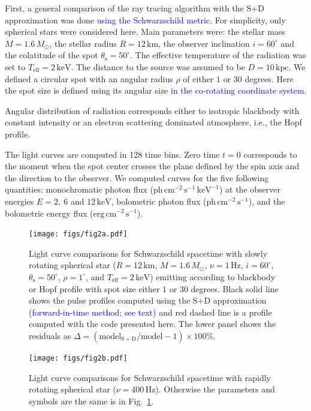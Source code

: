\documentclass{aa}
\newcommand{\refe}[1]{\textcolor{blue}{{#1}}}
\newcommand{\refedel}[1]{}
\newcommand{\sch}{Schwarzschild }
\newcommand{\Msun}{\ensuremath{M_{\odot}}}
\begin{document}
First, a general comparison of the ray tracing algorithm with the S+D approximation was done \refe{using the \sch metric.}
For simplicity, only spherical stars were considered here.
Main parameters were: the stellar mass $M = 1.6\,\Msun$, the stellar radius $R = 12\,\mathrm{km}$, the observer inclination $i = 60^{\circ}$ and the colatitude of the spot $\theta_{\mathrm{s}} = 50^{\circ}$.  
The effective temperature of the radiation was set to $T_{\mathrm{eff}} = 2\,\mathrm{keV}$.  
The distance to the source was assumed to be $D = 10\,\mathrm{kpc}$.  
We defined a circular spot with an angular radius $\rho$ of either $1$ or $30$ degrees.
Here the spot size is defined using its angular size \refe{in the co-rotating coordinate system.}
\refedel{Hence, the spot size is measured using the \textit{angular} size, not the \textit{spatial} size.}
Angular distribution of radiation corresponds either to isotropic blackbody with constant intensity or an electron scattering dominated atmosphere, i.e., the Hopf profile.


The light curves are computed in 128 time bins.  Zero time $t = 0$ corresponds to the moment when the spot center crosses the plane defined by the spin axis and the direction to the observer.  
We computed curves for the five following quantities: monochromatic photon flux ($\mathrm{ph}\,\mathrm{cm}^{-2}\,\mathrm{s}^{-1}\,\mathrm{keV}^{-1}$) at the observer energies $E = 2,~6$ and $12\,\mathrm{keV}$, bolometric photon flux ($\mathrm{ph}\,\mathrm{cm}^{-2}\,\mathrm{s}^{-1}$), and the bolometric energy flux ($\mathrm{erg}\,\mathrm{cm}^{-2}\,\mathrm{s}^{-1}$).


\begin{figure}
\centering
\texttt{[image: figs/fig2a.pdf]}
\caption{\label{fig:sch_comp1}
  Light curve comparisons for \sch spacetime with slowly rotating spherical star ($R = 12\,\mathrm{km}$, $M = 1.6\,\Msun$, $\nu = 1\,\mathrm{Hz}$, $i = 60^{\circ}$, $\theta_{\mathrm{s}} = 50^{\circ}$, $\rho = 1^{\circ}$, and $T_{\mathrm{eff}} = 2\,\mathrm{keV}$) emitting according to blackbody or Hopf profile with spot size either $1$ or $30$ degrees.
    Black solid line shows the pulse profiles computed using the S+D approximation \refe{(forward-in-time method; see text)} and red dashed line is a profile computed with the code presented here.
  The lower panel shows the residuals as $\Delta = (\mathrm{model_{S+D}}/\mathrm{model} -1) \times 100\%$.
}
\end{figure}

\begin{figure}
\centering
\texttt{[image: figs/fig2b.pdf]}
\caption{\label{fig:sch_comp400}
  Light curve comparisons for \sch spacetime with rapidly rotating spherical star ($\nu = 400\,\mathrm{Hz}$).
  Otherwise the parameters and symbols are the same is in Fig.~\ref{fig:sch_comp1}.
}
\end{figure}
\end{document}
